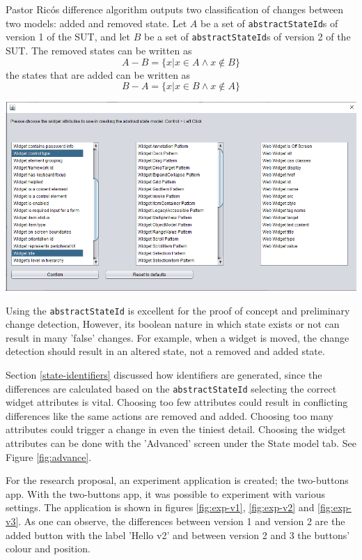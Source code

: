 Pastor Ricós difference algorithm\cite{stateDiff} outputs two classification of changes between two models: added and removed state. Let $A$ be a set of \verb|abstractStateId|s of version 1 of the SUT, and let $B$ be a set of \verb|abstractStateId|s of version 2 of the SUT. The removed states can be written as
\[A-B = \lbrace x | x \in A \wedge x \notin B \rbrace\]
the states that are added can be written as
\[B-A = \lbrace x | x \in B \wedge x \notin A \rbrace\]

\begingroup
\captionsetup{type=figure}
\includegraphics[scale=0.5]{images/attributes-state-model.png}
\label{fig:advance}
\endgroup

Using the \verb|abstractStateId| is excellent for the proof of concept and preliminary change detection, 
However, its boolean nature in which state exists or not can result in many 'false' changes. For example, when a widget is moved, the change detection should result in an altered state, not a removed and added state. 

Section \ref{state-identifiers} discussed how identifiers are generated, since the differences are calculated based on the \verb|abstractStateId| selecting the correct widget attributes is vital. Choosing too few attributes could result in conflicting differences like the same actions are removed and added. Choosing too many attributes could trigger a change in even the tiniest detail. Choosing the widget attributes can be done with the 'Advanced' screen under the State model tab. See Figure \ref{fig:advance}.

For the research proposal, an experiment application is created; the two-buttons app. With the two-buttons app, it was possible to experiment with various \testar settings. The application is shown in figures \ref{fig:exp-v1}, \ref{fig:exp-v2} and \ref{fig:exp-v3}. As one can observe, the differences between version 1 and version 2 are the added button with the label 'Hello v2' and between version 2 and 3 the buttons' colour and position. 

